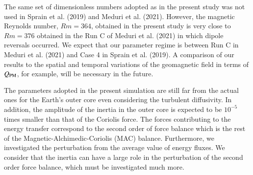 {\color{red}
{\color{teal}
The same set of dimensionless numbers adopted as in the present study was not used in Sprain et al. (2019) and Meduri et al. (2021).
However, the magnetic Reynolds number, $Rm = 364$, obtained in the present study is very close to $Rm = 376$ obtained in the Run C of Meduri et al. (2021) in which dipole reversals occurred.
}
We expect that our parameter regime is between Run C in Meduri et al. (2021) and Case 4 in Sprain et al. (2019). 
}
{\color{teal}
A comparison of our results to the spatial and temporal variations of the geomagnetic field in terms of $Q_{\rm PM}$, for example, will be necessary in the future.}

{\color{blue}
The parameters adopted in the present simulation are still far from the actual ones for the Earth's outer core even considering the turbulent diffusivity. 
In addition, the amplitude of the inertia in the outer core is expected to be $10^{-5}$ times smaller than that of the Coriolis force. 
The forces contributing to the energy transfer correspond to the second order of force balance which is the rest of the Magnetic-Alchimedic-Coriolis (MAC) balance. 
Furthermore, we investigated the perturbation from the average value of energy fluxes. 
{\color{teal}
We consider that the inertia can have a large role in the perturbation of the second order force balance, which must be investigated much more.
}
}

